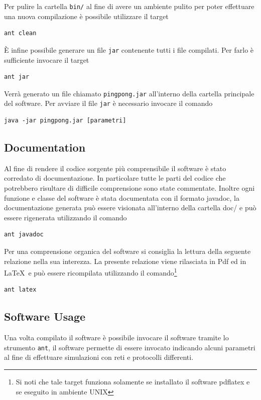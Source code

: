 \documentclass[a4paper,11pt]{article}
\begin{document}
Per pulire la cartella \texttt{bin/} al fine di avere un ambiente pulito per poter effettuare una nuova compilazione \`e possibile utilizzare il target
\begin{lstlisting}
ant clean
\end{lstlisting}

\`E infine possibile generare un file \texttt{jar} contenente tutti i file compilati. Per farlo \`e sufficiente invocare il target
\begin{lstlisting}
ant jar
\end{lstlisting}
Verr\`a generato un file chiamato \texttt{pingpong.jar} all'interno della cartella principale del software.
Per avviare il file \texttt{jar} \`e necessario invocare il comando
\begin{lstlisting}
java -jar pingpong.jar [parametri]
\end{lstlisting}

\subsection{Documentation}

Al fine di rendere il codice sorgente pi\`u comprensibile il software \`e stato corredato di documentazione. In particolare tutte le parti del codice che potrebbero risultare di difficile comprensione sono state commentate. Inoltre ogni funzione e classe del software \`e stata documentata con il formato \textsf {javadoc}, la documentazione generata pu\`o essere visionata all'interno della cartella \textsf{doc/} e pu\`o essere rigenerata utilizzando il comando
\begin{lstlisting}
ant javadoc
\end{lstlisting}

Per una comprensione organica del software si consiglia la lettura della seguente relazione nella sua interezza. La presente relazione viene rilasciata in Pdf ed in \LaTeX\ e pu\`o essere ricompilata utilizzando il comando\footnote{Si noti che tale target funziona solamente se installato il software \textsf{pdflatex} e se eseguito in ambiente UNIX}
\begin{lstlisting}
ant latex
\end{lstlisting}


\subsection{Software Usage}

Una volta compilato il software \`e possibile invocare il software tramite lo strumento \texttt{ant}, il software permette di essere invocato indicando alcuni parametri al fine di effettuare simulazioni con reti e protocolli differenti.
\end{document}
